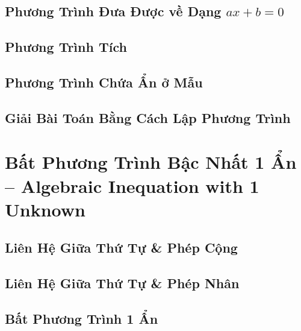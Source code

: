 \documentclass{article}
\numberwithin{equation}{section}
\begin{document}
\subsection{Phương Trình Đưa Được về Dạng $ax + b = 0$}


\subsection{Phương Trình Tích}


\subsection{Phương Trình Chứa Ẩn ở Mẫu}


\subsection{Giải Bài Toán Bằng Cách Lập Phương Trình}


\section{Bất Phương Trình Bậc Nhất 1 Ẩn -- Algebraic Inequation with 1 Unknown}

\subsection{Liên Hệ Giữa Thứ Tự \& Phép Cộng}


\subsection{Liên Hệ Giữa Thứ Tự \& Phép Nhân}


\subsection{Bất Phương Trình 1 Ẩn}
\end{document}
